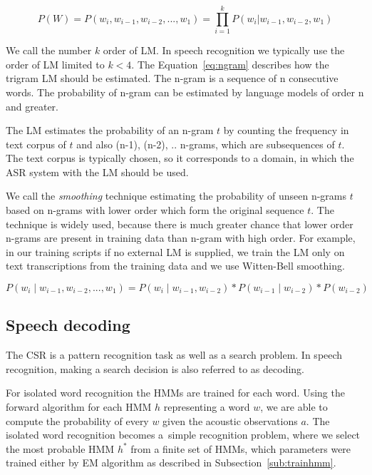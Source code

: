 {\begin{equation} \label{eq:lm}
    P(W)=P(w_i,  w_{i-1}, w_{i-2}, ..., w_1)=\prod_{i=1}^{k}{P(w_i|w_{i-1}, w_{i-2}, w_1)}
\end{equation}

We call the number $k$ order of \ac{LM}.
In speech recognition we typically use the order of \ac{LM} limited to $k<4$.
The Equation~\ref{eq:ngram} describes how the trigram \ac{LM} should be estimated.
The n-gram is a sequence of n consecutive words. The probability of n-gram can be estimated by language models
of order n and greater.

The \ac{LM} estimates the probability of an n-gram $t$ by counting the frequency in text corpus of $t$ and 
also (n-1), (n-2), .. n-grams, which are subsequences of $t$.
The text corpus is typically chosen, so it corresponds to a domain, in which the \ac{ASR} system 
with the \ac{LM} should be used.

We call the {\it smoothing}\/ technique estimating the probability of unseen n-grams $t$ 
based on n-grams with lower order which form the original sequence $t$.
The technique is widely used, because there is much greater chance that lower order n-grams are
present in training data than n-gram with high order.
For example, in our training scripts if no external \ac{LM} is supplied,
we train the \ac{LM} only on text transcriptions from the training data
and we use Witten-Bell smoothing.\cite{witten1991zero}

\begin{equation} \label{eq:ngram}
    P(w_i \mid w_{i-1}, w_{i-2}, ..., w_1) = P(w_i \mid w_{i-1}, w_{i-2}) * P(w_{i-1} \mid w_{i-2}) * P(w_{i-2})
\end{equation}

\subsection{Speech decoding}
\label{sub:decode}
The \ac{CSR} is a pattern recognition task as well as a search problem.
In speech recognition, making a search decision is also referred to as decoding.\cite{huang2001spoken}


For isolated word recognition the \acp{HMM} are trained for each word.
Using the forward algorithm for each \ac{HMM} $h$ representing a word $w$, 
we are able to compute the probability  of every $w$ given the acoustic observations $a$.
The isolated word recognition becomes a~simple recognition problem,
where we select the most probable \ac{HMM} $h^*$ from a finite set of \acp{HMM},
which parameters were trained either by \ac{EM} algorithm as described in Subsection~\ref{sub:trainhmm}.

}
